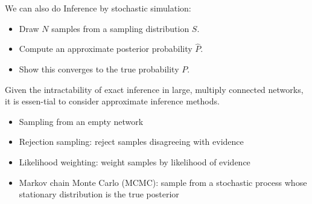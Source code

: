 \documentclass[12pt]{article}
\begin{document}
\begin{enumerate}[label=\textbf{U.\arabic*}]
    We can also do Inference by stochastic simulation:
    \begin{itemize}
        \item Draw $N$ samples from a sampling distribution $S$.
        \item Compute an approximate posterior probability $\hat{P}$.
        \item Show this converges to the true probability $P$.
    \end{itemize}

    Given the intractability of exact inference in large, multiply connected networks, it is essen-tial to consider approximate inference methods.
    \begin{itemize}
        \item Sampling from an empty network
        \item Rejection sampling: reject samples disagreeing with evidence
        \item Likelihood weighting: weight samples by likelihood of evidence
        \item Markov chain Monte Carlo (MCMC): sample from a stochastic process whose stationary distribution is the true posterior
    \end{itemize}
\end{enumerate}
\end{document}
